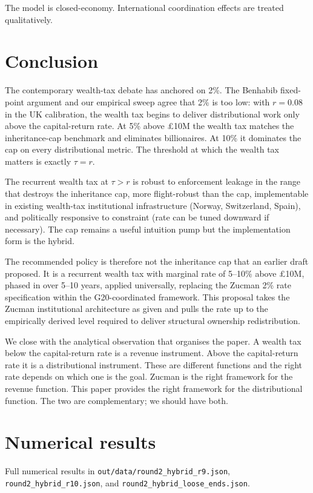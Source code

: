 \documentclass[11pt]{article}
\begin{document}
The model is closed-economy.  International coordination effects
are treated qualitatively.

\section{Conclusion}
\label{sec:conclusion}

The contemporary wealth-tax debate has anchored on 2\%.  The
Benhabib fixed-point argument and our empirical sweep agree that
2\% is too low: with $r = 0.08$ in the UK calibration, the
wealth tax begins to deliver distributional work only above the
capital-return rate.  At 5\% above \pounds 10M the wealth tax
matches the inheritance-cap benchmark and eliminates billionaires.
At 10\% it dominates the cap on every distributional metric.  The
threshold at which the wealth tax matters is exactly $\tau = r$.

The recurrent wealth tax at $\tau > r$ is robust to enforcement
leakage in the range that destroys the inheritance cap, more
flight-robust than the cap, implementable in existing wealth-tax
institutional infrastructure (Norway, Switzerland, Spain), and
politically responsive to constraint (rate can be tuned downward
if necessary).  The cap remains a useful intuition pump but the
implementation form is the hybrid.

The recommended policy is therefore not the inheritance cap that
an earlier draft proposed.  It is a recurrent wealth tax with
marginal rate of 5--10\% above \pounds 10M, phased in over 5--10
years, applied universally, replacing the Zucman 2\% rate
specification within the G20-coordinated framework.  This proposal
takes the Zucman institutional architecture as given and pulls
the rate up to the empirically derived level required to deliver
structural ownership redistribution.

We close with the analytical observation that organises the paper.
A wealth tax below the capital-return rate is a revenue
instrument.  Above the capital-return rate it is a distributional
instrument.  These are different functions and the right rate
depends on which one is the goal.  Zucman is the right framework
for the revenue function.  This paper provides the right framework
for the distributional function.  The two are complementary; we
should have both.




\appendix
\section{Numerical results}
\label{app:numerics}

Full numerical results in
\texttt{out/data/round2\_hybrid\_r9.json},
\texttt{round2\_hybrid\_r10.json}, and
\texttt{round2\_hybrid\_loose\_ends.json}.
\end{document}
